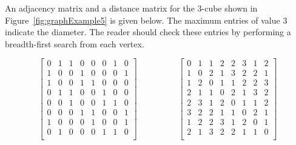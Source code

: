 \begin{Example}

An adjacency matrix and a distance matrix for the 3-cube shown in
Figure~\ref{fig:graphExample5} is given below.  The maximum entries of
value $3$ indicate the diameter. The reader should check these entries
by performing a breadth-first search from each vertex.

\[
\left[
\begin{array}{cccccccc}

0& 1& 1& 0& 0& 0& 1& 0\\

1& 0& 0& 1& 0& 0& 0& 1 \\

1& 0& 0& 1& 1& 0& 0& 0\\

0& 1& 1& 0& 0& 1& 0& 0 \\

0& 0& 1& 0& 0& 1& 1& 0 \\

0& 0& 0& 1& 1& 0& 0& 1 \\

1& 0& 0& 0& 1& 0& 0& 1 \\

0& 1& 0& 0& 0& 1& 1& 0 \\

\end{array}
\right]
\hspace{2cm}
\left[
\begin{array}{cccccccc}

0& 1& 1& 2& 2& 3& 1& 2\\

1& 0& 2& 1& 3& 2& 2& 1\\

1& 2& 0& 1& 1& 2& 2& 3\\

2& 1& 1& 0& 2& 1& 3& 2\\

2& 3& 1& 2& 0& 1& 1& 2\\

3& 2& 2& 1& 1& 0& 2& 1\\

1& 2& 2& 3& 1& 2& 0& 1\\

2& 1& 3& 2& 2& 1& 1& 0\\

\end{array}
\right]
\]

\end{Example}

